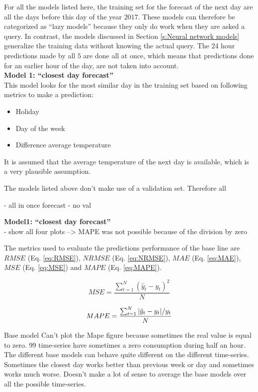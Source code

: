 For all the models listed here, the training set for the forecast of the next day are all the days before this day of the year $ 2017 $. These models can therefore be categorized as ``lazy models'' because they only do work when they are asked a query. In contrast, the models discussed in Section \ref{s:Neural network models} generalize the training data without knowing the actual query. The 24 hour predictions made by all $ 5 $ are done all at once, which means that predictions done for an earlier hour of the day, are not taken into account.\\

\textbf{Model 1: ``closest day forecast''}\\
This model looks for the most similar day in the training set based on following metrics to make a prediction:

\begin{itemize}
	\item Holiday
	\item Day of the week
	\item Difference average temperature
\end{itemize}
 
 It is assumed that the average temperature of the next day is available, which is a very plausible assumption.

The models listed above don't make use of a validation set. Therefore all 

- all in once forecast
- no val

\textbf{Model1: ``closest day forecast''}\\


- show all four plots --> MAPE was not possible because of the division by zero

The metrics used to evaluate the predictions performance of the base line are $ RMSE $ (Eq. \ref{eq:RMSE}), $ NRMSE $ (Eq. \ref{eq:NRMSE}), $ MAE $ (Eq. \ref{eq:MAE}), $ MSE $ (Eq. \ref{eq:MSE}) and $ MAPE $ (Eq. \ref{eq:MAPE}).

\begin{equation}\label{eq:MSE}
	MSE = \frac{\sum_{t=1}^{N}(\hat{y}_t-y_t)^2}{N}
\end{equation}

\begin{equation}\label{eq:MAPE}
	MAPE = \frac{\sum_{t=1}^{N}\abs{\hat{y}_t-y_t}/y_t}{N}
\end{equation}




Base model
Can't plot the Mape figure because sometimes the real value is equal to zero. 99 time-series have sometimes a zero consumption during half an hour.
The different base models can behave quite different on the different time-series. Sometimes the closest day works better than previous week or day and sometimes works much worse. Doesn't make a lot of sense to average the base models over all the possible time-series. 

